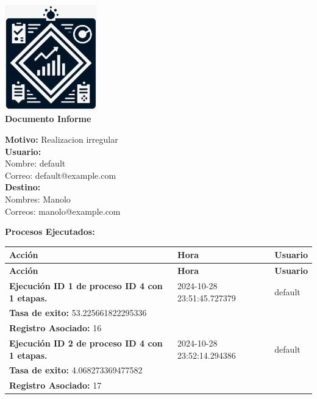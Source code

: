 \documentclass[a4paper,10pt]{article}
\begin{document}
\begin{center}
    \includegraphics[width=0.3\textwidth]{logo.jpeg} %
    \\[1em]
    {\LARGE \textbf{Documento Informe}}
\end{center}

\vspace{1em}

\noindent \textbf{Motivo:} Realizacion irregular \\[0.5em]

\noindent \textbf{Usuario:} \\
Nombre: default \\
Correo: default@example.com \\[0.5em]

\noindent \textbf{Destino:} \\
Nombres: Manolo \\
Correos: manolo@example.com \\[0.5em]

\vspace{1.5em}

\noindent \textbf{Procesos Ejecutados:} \\
\begin{longtable}{|p{}|p{}|p{}|}
    \hline
    \textbf{Acción} & \textbf{Hora} & \textbf{Usuario} \\
    \hline
    \endfirsthead
    \hline
    \textbf{Acción} & \textbf{Hora} & \textbf{Usuario} \\
    \hline
    \endhead
    \hline
    \endfoot
 \textbf{Ejecución ID 1 de proceso ID 4 con 1 etapas.} &  2024-10-28 23:51:45.727379 &  default \\ 
 \textbf{Tasa de exito:} 53.225661822295336 & & \\ 
 \textbf{Registro Asociado:} 16 & & \\ 
 \hline 
 \textbf{Ejecución ID 2 de proceso ID 4 con 1 etapas.} &  2024-10-28 23:52:14.294386 &  default \\ 
 \textbf{Tasa de exito:} 4.068273369477582 & & \\ 
 \textbf{Registro Asociado:} 17 & & \\ 
 \hline 

\end{longtable}
\end{document}
